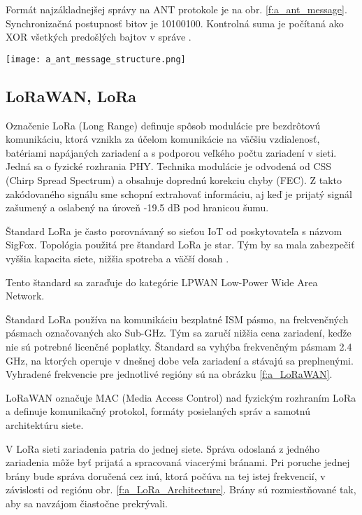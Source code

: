 \documentclass[12pt,a4paper,oneside,openright]{report}
\begin{document}
Formát najzákladnejšej správy na ANT protokole je na obr. \ref{f:a_ant_message}. Synchronizačná postupnosť bitov je 10100100. Kontrolná suma je počítaná ako XOR všetkých predošlých bajtov v správe \cite{ANT}.

\begin{figure*}[h!]
	\centering
	\texttt{[image: a\_ant\_message\_structure.png]}
\caption{Najjednoduchší formát správy protokolu ANT\cite{ANT}.}
\label{f:a_ant_message}
\end{figure*}

\subsection{LoRaWAN, LoRa}
Označenie LoRa (Long Range) definuje spôsob modulácie pre bezdrôtovú komunikáciu, ktorá vznikla za účelom komunikácie na väčšiu vzdialenosť, batériami napájaných zariadení a s podporou veľkého počtu zariadení v sieti. Jedná sa o fyzické rozhrania PHY. Technika modulácie je odvodená od CSS (Chirp Spread Spectrum) a obsahuje doprednú korekciu chyby (FEC). Z takto zakódovaného signálu sme schopní extrahovať informáciu, aj keď je prijatý signál zašumený a oslabený na úroveň -19.5 dB pod hranicou šumu.

Štandard LoRa je často porovnávaný so sieťou IoT od poskytovateľa s názvom SigFox. Topológia použitá pre štandard LoRa je star. Tým by sa mala zabezpečiť vyššia kapacita siete, nižšia spotreba a väčší dosah \cite{LoRaSpec}\cite{LoRaFAQ}.

Tento štandard sa zaraďuje do kategórie LPWAN Low-Power Wide Area Network. 

Štandard LoRa používa na komunikáciu bezplatné ISM pásmo, na frekvenčných pásmach označovaných ako Sub-GHz. Tým sa zaručí nižšia cena zariadení, keďže nie sú potrebné licenčné poplatky. Štandard sa vyhýba frekvenčným pásmam 2.4 GHz, na ktorých operuje v dnešnej dobe veľa zariadení a stávajú sa preplnenými. Vyhradené frekvencie pre jednotlivé regióny sú na obrázku \ref{f:a_LoRaWAN}.

LoRaWAN označuje MAC (Media Access Control) nad fyzickým rozhraním LoRa a definuje komunikačný protokol, formáty posielaných správ a samotnú architektúru siete.

V LoRa sieti zariadenia patria do jednej siete. Správa odoslaná z jedného zariadenia môže byť prijatá a spracovaná viacerými bránami. Pri poruche jednej brány bude správa doručená cez inú, ktorá počúva na tej istej frekvencií, v závislosti od regiónu obr. \ref{f:a_LoRa_Architecture}. Brány sú rozmiestňované tak, aby sa navzájom čiastočne prekrývali.
\end{document}
